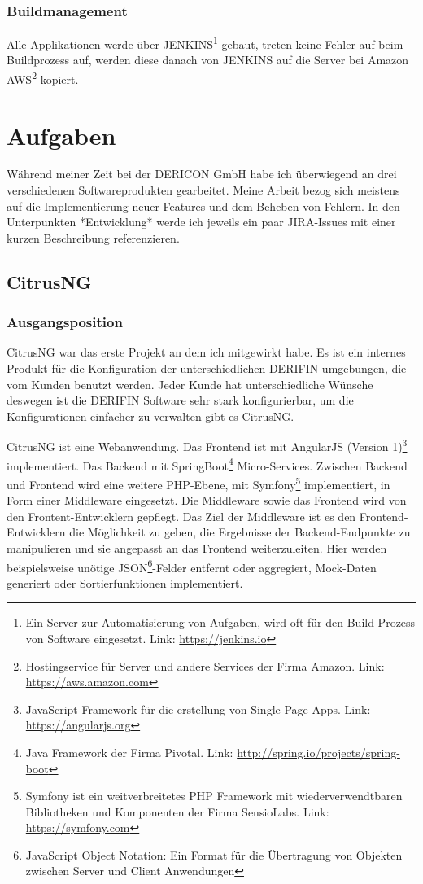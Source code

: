 \documentclass[chapterprefix=false, 12pt, a4paper, oneside, parskip=half, listof=totoc, bibliography=totoc, numbers=noendperiod]{scrbook}
\begin{document}
    \subsection{Buildmanagement}

    Alle Applikationen werde über JENKINS\footnote{Ein Server zur Automatisierung von Aufgaben, wird oft für den Build-Prozess von Software eingesetzt. Link: \url{https://jenkins.io}} gebaut,
    treten keine Fehler auf beim Buildprozess auf, werden diese danach von JENKINS auf die Server bei Amazon AWS\footnote{Hostingservice für Server und andere Services der Firma Amazon. Link: \url{https://aws.amazon.com}} kopiert.

    \chapter{Aufgaben}

    Während meiner Zeit bei der DERICON GmbH habe ich überwiegend an drei verschiedenen Softwareprodukten gearbeitet.
    Meine Arbeit bezog sich meistens auf die Implementierung neuer Features und dem Beheben von Fehlern. In den Unterpunkten *Entwicklung*
    werde ich jeweils ein paar JIRA-Issues mit einer kurzen Beschreibung referenzieren.

    \section{CitrusNG}

    \subsection{Ausgangsposition}

    CitrusNG war das erste Projekt an dem ich mitgewirkt habe. Es ist ein internes Produkt für die Konfiguration der unterschiedlichen DERIFIN umgebungen, die
    vom Kunden benutzt werden. Jeder Kunde hat unterschiedliche Wünsche deswegen ist die DERIFIN Software sehr stark konfigurierbar, um die Konfigurationen einfacher
    zu verwalten gibt es CitrusNG.

    CitrusNG ist eine Webanwendung. Das Frontend ist mit AngularJS (Version 1)\footnote{JavaScript Framework für die erstellung von
    Single Page Apps. Link: \url{https://angularjs.org}} implementiert.
    Das Backend mit SpringBoot\footnote{Java Framework der Firma Pivotal. Link: \url{http://spring.io/projects/spring-boot}} Micro-Services.
    Zwischen Backend und Frontend wird eine weitere PHP-Ebene, mit Symfony\footnote{Symfony ist ein weitverbreitetes
    PHP Framework mit wiederverwendtbaren Bibliotheken und Komponenten der Firma SensioLabs. Link: \url{https://symfony.com}}
    implementiert, in Form einer Middleware eingesetzt. Die Middleware sowie das Frontend wird von den Frontent-Entwicklern gepflegt.
    Das Ziel der Middleware ist es den Frontend-Entwicklern die Möglichkeit zu geben, die Ergebnisse der
    Backend-Endpunkte zu manipulieren und sie angepasst an das Frontend weiterzuleiten. 
    Hier werden beispielsweise unötige JSON\footnote{JavaScript Object Notation: Ein Format für die Übertragung von
    Objekten zwischen Server und Client Anwendungen}-Felder entfernt oder
    aggregiert, Mock-Daten generiert oder Sortierfunktionen implementiert.
\end{document}
